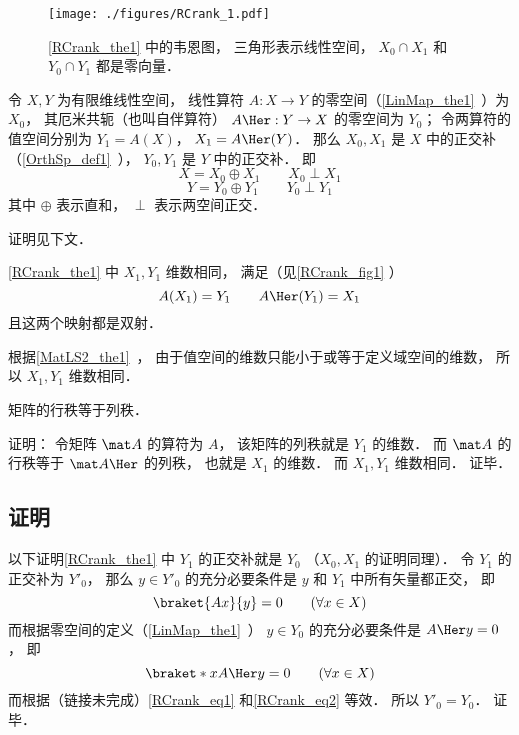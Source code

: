 

\begin{figure}[ht]
\centering
\texttt{[image: ./figures/RCrank\_1.pdf]}
\caption{\autoref{RCrank_the1} 中的韦恩图， 三角形表示线性空间， $X_0\cap X_1$ 和 $Y_0\cap  Y_1$ 都是零向量．} \label{RCrank_fig1}
\end{figure}

\begin{theorem}{}\label{RCrank_the1}
令 $X, Y$ 为有限维线性空间， 线性算符 $A:X \to Y$ 的零空间（\autoref{LinMap_the1}~）为 $X_0$， 其厄米共轭（也叫自伴算符） $A\Her: Y \to X$ 的零空间为 $Y_0$； 令两算符的值空间分别为 $Y_1 = A(X)$， $X_1 = A\Her(Y)$． 那么 $X_0, X_1$ 是 $X$ 中的正交补（\autoref{OrthSp_def1}~）， $Y_0, Y_1$ 是 $Y$ 中的正交补． 即
\begin{equation}
X = X_0 \oplus X_1 \qquad X_0 \perp X_1
\end{equation}
\begin{equation}
Y = Y_0 \oplus Y_1 \qquad Y_0 \perp Y_1
\end{equation}
其中 $\oplus$ 表示直和， $\perp$ 表示两空间正交．
\end{theorem}
证明见下文．

\begin{corollary}{}
\autoref{RCrank_the1} 中 $X_1, Y_1$ 维数相同， 满足（见\autoref{RCrank_fig1} ）
\begin{equation}\label{RCrank_eq3}
A(X_1) = Y_1 \qquad A\Her (Y_1) = X_1
\end{equation}
且这两个映射都是双射．
\end{corollary}
根据\autoref{MatLS2_the1}~， 
由于值空间的维数只能小于或等于定义域空间的维数， 所以 $X_1, Y_1$ 维数相同．

\begin{corollary}{}\label{RCrank_cor1}
矩阵的行秩等于列秩．
\end{corollary}
证明： 令矩阵 $\mat A$ 的算符为 $A$， 该矩阵的列秩就是 $Y_1$ 的维数． 而 $\mat A$ 的行秩等于 $\mat A\Her$ 的列秩， 也就是 $X_1$ 的维数． 而 $X_1, Y_1$ 维数相同． 证毕．

\subsection{证明}
以下证明\autoref{RCrank_the1} 中 $Y_1$ 的正交补就是 $Y_0$ （$X_0, X_1$ 的证明同理）． 令 $Y_1$ 的正交补为 $Y'_0$， 那么 $y \in Y'_0$ 的充分必要条件是 $y$ 和 $Y_1$ 中所有矢量都正交， 即
\begin{equation}\label{RCrank_eq1}
\braket{Ax}{y} = 0 \qquad (\forall x \in X)
\end{equation}
而根据零空间的定义（\autoref{LinMap_the1}~） $y \in Y_0$ 的充分必要条件是 $A\Her y = 0$， 即
\begin{equation}\label{RCrank_eq2}
\braket*{x}{A\Her y} = 0 \qquad (\forall x \in X)
\end{equation}
而根据（链接未完成）\autoref{RCrank_eq1} 和\autoref{RCrank_eq2} 等效． 所以 $Y'_0 = Y_0$． 证毕．
